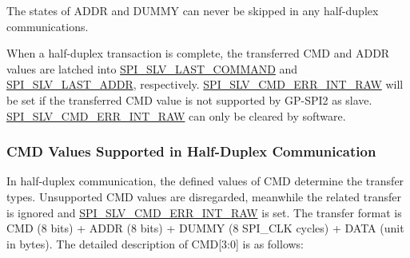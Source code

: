 \documentclass[main\_\_EN.tex]{subfiles}
\begin{document}
\begin{tiplisting}
The states of ADDR and DUMMY can never be skipped in any half-duplex communications.
\end{tiplisting}
\vspace{-1em}
When a half-duplex transaction is complete, the transferred CMD and ADDR values are latched into \hyperref[fielddesc:SPISLVLASTCOMMAND]{SPI\_SLV\_LAST\_COMMAND} and \hyperref[fielddesc:SPISLVLASTADDR]{SPI\_SLV\_LAST\_ADDR}, respectively. \hyperref[fielddesc:SPISLVCMDERRINTRAW]{SPI\_SLV\_CMD\_ERR\_INT\_RAW} will be set if the transferred CMD value is not supported by GP-SPI2 as slave. \hyperref[fielddesc:SPISLVCMDERRINTRAW]{SPI\_SLV\_CMD\_ERR\_INT\_RAW} can only be cleared by software.


\subsubsection{CMD Values Supported in Half-Duplex Communication} \label{GP-SPI HD salve format}

In half-duplex communication, the defined values of CMD determine the transfer types. Unsupported CMD values are disregarded, meanwhile the related transfer is ignored and \hyperref[fielddesc:SPISLVCMDERRINTRAW]{SPI\_SLV\_CMD\_ERR\_INT\_RAW} is set. The transfer format is CMD (8 bits) + ADDR (8 bits) + DUMMY (8 SPI\_CLK cycles) + DATA (unit in bytes). The detailed description of CMD[3:0] is as follows:
\end{document}
